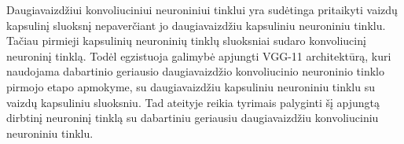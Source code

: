 Daugiavaizdžiui konvoliuciniui neuroniniui tinklui yra sudėtinga pritaikyti vaizdų kapsulinį sluoksnį nepaverčiant jo daugiavaizdžiu kapsuliniu neuroniniu tinklu. Tačiau pirmieji kapsulinių neuroninių tinklų sluoksniai sudaro konvoliucinį neuroninį tinklą. Todėl egzistuoja galimybė apjungti VGG-11 architektūrą, kuri naudojama dabartinio geriausio daugiavaizdžio konvoliucinio neuroninio tinklo pirmojo etapo apmokyme, su daugiavaizdžiu kapsuliniu neuroniniu tinklu su vaizdų kapsuliniu sluoksniu. Tad ateityje reikia tyrimais palyginti šį apjungtą dirbtinį neuroninį tinklą su dabartiniu geriausiu daugiavaizdžiu konvoliuciniu neuroniniu tinklu.
